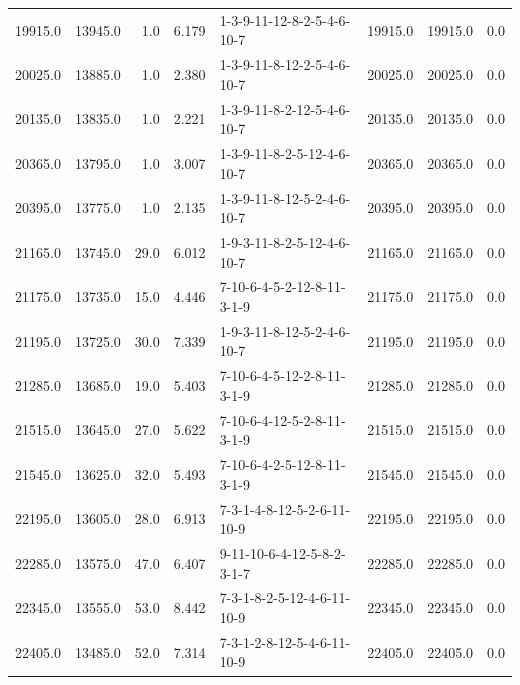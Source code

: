 \begin{tabular}{rrrrlrrr}
 19915.0 &  13945.0 &            1.0 &              6.179 &  1-3-9-11-12-8-2-5-4-6-10-7 &       19915.0 &         19915.0 &       0.0 \\
 20025.0 &  13885.0 &            1.0 &              2.380 &  1-3-9-11-8-12-2-5-4-6-10-7 &       20025.0 &         20025.0 &       0.0 \\
 20135.0 &  13835.0 &            1.0 &              2.221 &  1-3-9-11-8-2-12-5-4-6-10-7 &       20135.0 &         20135.0 &       0.0 \\
 20365.0 &  13795.0 &            1.0 &              3.007 &  1-3-9-11-8-2-5-12-4-6-10-7 &       20365.0 &         20365.0 &       0.0 \\
 20395.0 &  13775.0 &            1.0 &              2.135 &  1-3-9-11-8-12-5-2-4-6-10-7 &       20395.0 &         20395.0 &       0.0 \\
 21165.0 &  13745.0 &           29.0 &              6.012 &  1-9-3-11-8-2-5-12-4-6-10-7 &       21165.0 &         21165.0 &       0.0 \\
 21175.0 &  13735.0 &           15.0 &              4.446 &  7-10-6-4-5-2-12-8-11-3-1-9 &       21175.0 &         21175.0 &       0.0 \\
 21195.0 &  13725.0 &           30.0 &              7.339 &  1-9-3-11-8-12-5-2-4-6-10-7 &       21195.0 &         21195.0 &       0.0 \\
 21285.0 &  13685.0 &           19.0 &              5.403 &  7-10-6-4-5-12-2-8-11-3-1-9 &       21285.0 &         21285.0 &       0.0 \\
 21515.0 &  13645.0 &           27.0 &              5.622 &  7-10-6-4-12-5-2-8-11-3-1-9 &       21515.0 &         21515.0 &       0.0 \\
 21545.0 &  13625.0 &           32.0 &              5.493 &  7-10-6-4-2-5-12-8-11-3-1-9 &       21545.0 &         21545.0 &       0.0 \\
 22195.0 &  13605.0 &           28.0 &              6.913 &  7-3-1-4-8-12-5-2-6-11-10-9 &       22195.0 &         22195.0 &       0.0 \\
 22285.0 &  13575.0 &           47.0 &              6.407 &  9-11-10-6-4-12-5-8-2-3-1-7 &       22285.0 &         22285.0 &       0.0 \\
 22345.0 &  13555.0 &           53.0 &              8.442 &  7-3-1-8-2-5-12-4-6-11-10-9 &       22345.0 &         22345.0 &       0.0 \\
 22405.0 &  13485.0 &           52.0 &              7.314 &  7-3-1-2-8-12-5-4-6-11-10-9 &       22405.0 &         22405.0 &       0.0 \\

\end{tabular}
